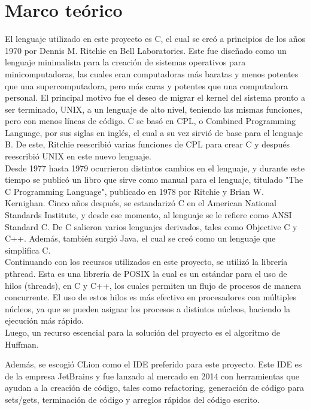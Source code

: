 \documentclass[12pt, article, natbib]{IEEEtran}
\begin{document}
\section{Marco teórico}
El lenguaje utilizado en este proyecto es C, el cual se creó a principios de los años 1970 por Dennis M. Ritchie en Bell Laboratories. Este fue diseñado como un lenguaje minimalista para la creación de sistemas operativos para minicomputadoras, las cuales eran computadoras más baratas y menos potentes que una supercomputadora, pero más caras y potentes que una computadora personal. El principal motivo fue el deseo de migrar el kernel del sistema pronto a ser terminado, UNIX, a un lenguaje de alto nivel, teniendo las mismas funciones, pero con menos líneas de código. C se basó en CPL, o Combined Programming Language, por sus siglas en inglés, el cual a su vez sirvió de base para el lenguaje B. De este, Ritchie reescribió varias funciones de CPL para crear C y después reescribió UNIX en este nuevo lenguaje.\cite{encyclopdiabritannica_2022_c} \cite{munoz_after}\\

Desde 1977 hasta 1979 ocurrieron distintos cambios en el lenguaje, y durante este tiempo se publicó un libro que sirve como manual para el lenguaje, titulado "The C Programming Language", publicado en 1978 por Ritchie y Brian W. Kernighan. Cinco años después, se estandarizó C en el American National Standards Institute, y desde ese momento, al lenguaje se le refiere como ANSI Standard C. De C salieron varios lenguajes derivados, tales como Objective C y C++. Además, también surgió Java, el cual se creó como un lenguaje que simplifica C.\cite{mritchie_1993_the}\\

Continuando con los recursos utilizados en este proyecto, se utilizó la librería pthread. Esta es una librería de POSIX la cual es un estándar para el uso de hilos (threads), en C y C++, los cuales permiten un flujo de procesos de manera concurrente. El uso de estos hilos es más efectivo en procesadores con múltiples núcleos, ya que se pueden asignar los procesos a distintos núcleos, haciendo la ejecución más rápido.\cite{ippolito_2020_linux}\\

Luego, un recurso escencial para la solución del proyecto es el algoritmo de Huffman. 

Además, se escogió CLion como el IDE preferido para este proyecto. Este IDE es de la empresa JetBrains y fue lanzado al mercado en 2014\cite{avram_2014_jetbrains} con herramientas que ayudan a la creación de código, tales como refactoring, generación de código para sets/gets, terminación de código y arreglos rápidos del código escrito.\cite{jetbrains_intelligent}\\
\end{document}
